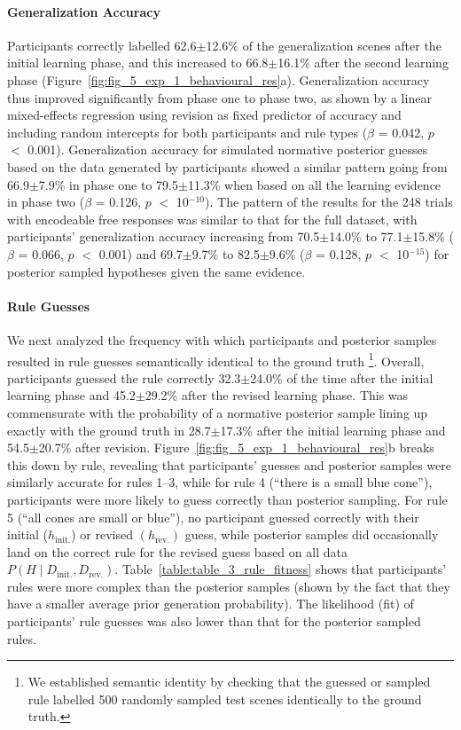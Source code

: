 \documentclass[doc,natbib,floatsintext]{apa7}
\newcommand{\dr}{D_{\mathrm{rev.}}}%
\newcommand{\di}{D_{\mathrm{init.}}}%
\newcommand{\hr}{h_{\mathrm{rev.}}}
\newcommand{\hi}{h_{\mathrm{init.}}}
\begin{document}
\paragraph{Generalization Accuracy}
Participants correctly labelled 62.6$\pm$12.6\% of the generalization scenes after the initial learning phase, and this increased to 66.8$\pm$16.1\% after the second learning phase (Figure~\ref{fig:fig_5_exp_1_behavioural_res}a). Generalization accuracy thus improved significantly from phase one to phase two, as shown by a linear mixed-effects regression using revision as fixed predictor of accuracy and including random intercepts for both participants and rule types ($\beta$ =  0.042, $p$ $<$ 0.001). Generalization accuracy for simulated normative posterior guesses based on the data generated by participants showed a similar pattern going from 66.9$\pm$7.9\% in phase one to 79.5$\pm$11.3\% when based on all the learning evidence in phase two ($\beta$ = 0.126, $p$ $<$ 10$^{-10}$). The pattern of the results for the 248 trials with encodeable free responses was similar to that for the full dataset, with participants' generalization accuracy increasing from 70.5$\pm$14.0\% to 77.1$\pm$15.8\% ($\beta$ = 0.066, $p$ $<$ 0.001) and 69.7$\pm$9.7\% to 82.5$\pm$9.6\% ($\beta$  = 0.128, $p$ $<$ 10$^{-15}$) for posterior sampled hypotheses given the same evidence. 

\paragraph{Rule Guesses}
We next analyzed the frequency with which participants and posterior samples resulted in rule guesses semantically identical to the ground truth \footnote{We established semantic identity by checking that the guessed or sampled rule labelled 500 randomly sampled test scenes identically to the ground truth.}. Overall, participants guessed the rule correctly 32.3$\pm$24.0\% of the time after the initial learning phase and 45.2$\pm$29.2\% after the revised learning phase. This was commensurate with the probability of a normative posterior sample lining up exactly with the ground truth in 28.7$\pm$17.3\% after the initial learning phase and 54.5$\pm$20.7\% after revision. Figure~\ref{fig:fig_5_exp_1_behavioural_res}b breaks this down by rule, revealing that participants' guesses and posterior samples were similarly accurate for rules 1--3, while for rule 4 (``there is a small blue cone''), participants were more likely to guess correctly than posterior sampling. For rule 5  (``all cones are small or blue''), no participant 
guessed correctly with their initial ($\hi$) or revised $(\hr)$ guess, while posterior samples did occasionally land on the correct rule for the revised guess based on all data $P(H\mid\di,\dr)$. Table~\ref{table:table_3_rule_fitness} shows that participants' rules were more complex than the posterior samples (shown by the fact that they have a smaller average prior generation probability). The likelihood (fit) of participants' rule guesses was also lower than that for the posterior sampled rules. 
\end{document}
